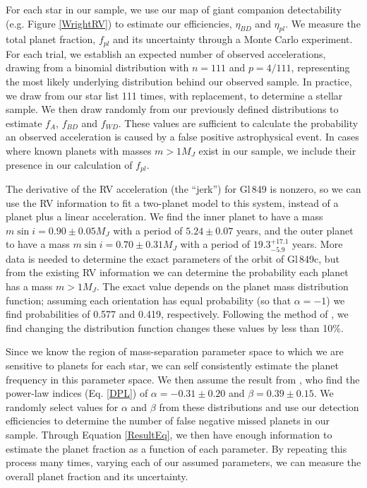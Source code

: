 For each star in our sample, we use our map of giant companion detectability (e.g. Figure \ref{WrightRV}) to estimate our efficiencies, $\eta_{BD}$ and $\eta_{pl}$. We measure the total planet fraction, $f_{pl}$ and its uncertainty through a Monte Carlo experiment. For each trial, we establish an expected number of observed accelerations, drawing from a binomial distribution with $n=111$ and $p = 4/111$, representing the most likely underlying distribution behind our observed sample. In practice, we draw from our star list 111 times, with replacement, to determine a stellar sample. We then draw randomly from our previously defined distributions to estimate $f_A$, $f_{BD}$ and $f_{WD}$. These values are sufficient to calculate the probability an observed acceleration is caused by a false positive astrophysical event. In cases where known planets with masses $m > 1 M_J$ exist in our sample, we include their presence in our calculation of $f_{pl}$. 

The derivative of the RV acceleration (the ``jerk'') for Gl\,849 is nonzero, so we can use the RV information to fit a two-planet model to this system, instead of a planet plus a linear acceleration. We find the inner planet to have a mass $m\sin i = 0.90 \pm 0.05 M_J$ with a period of $5.24 \pm 0.07$ years, and the outer planet to have a mass $m \sin i = 0.70 \pm 0.31 M_J$ with a period of $19.3^{+17.1}_{-5.9}$ years. More data is needed to determine the exact parameters of the orbit of Gl\,849c, but from the existing RV information we can determine the probability each planet has a mass $m > 1 M_J$. The exact value depends on the planet mass distribution function; assuming each orientation has equal probability (so that $\alpha=-1$) we find probabilities of 0.577 and 0.419, respectively. Following the method of \citet{Ho11}, we find changing the distribution function changes these values by less than 10\%. 


Since we know the region of mass-separation parameter space to which we are sensitive to planets for each star, we can self consistently estimate the planet frequency in this parameter space. We then assume the result from \citet{Cumming08}, who find the power-law indices (Eq. \ref{DPL}) of $\alpha = -0.31 \pm 0.20$ and $\beta = 0.39 \pm 0.15$. We randomly select values for $\alpha$ and $\beta$ from these distributions and use our detection efficiencies to determine the number of false negative missed planets in our sample. Through Equation \ref{ResultEq}, we then have enough information to estimate the planet fraction as a function of each parameter. By repeating this process many times, varying each of our assumed parameters, we can measure the overall planet fraction and its uncertainty.



